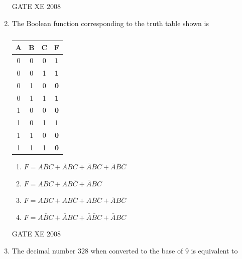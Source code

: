 \documentclass[12pt]{article}
\begin{document}
\begin{enumerate}
\begin{enumerate}
\end{enumerate}

GATE XE 2008
\item  The Boolean function corresponding to the truth table shown is

\begin{table}[H]     \centering     \caption{}     \label{}     \begin{tabular}{c|c|c|c}
    A & B & C & \textbf{F}  \\
    \hline
    0 & 0 & 0 & \textbf{1}   \\
    \hline
    0 & 0 & 1 & \textbf{1}  \\
    \hline
    0 & 1 & 0 & \textbf{0} \\
    \hline
    0 & 1 & 1 & \textbf{1} \\
    \hline
    1 & 0 & 0 & \textbf{0} \\
    \hline
    1 & 0 & 1 & \textbf{1} \\
    \hline
    1 & 1 & 0 & \textbf{0} \\
    \hline
    1 & 1 & 1 & \textbf{0} \\
    \hline
\end{tabular} \end{table}

\begin{enumerate}
\item  $F=A\bar{B}C + \bar{A}BC +\bar{A}\bar{B}C + \bar{A}\bar{B}\bar{C}$
\item  $F=ABC + AB\bar{C} + \bar{A}BC$
\item  $F=ABC + AB\bar{C} +A\bar{B}\bar{C} +\bar{A}B\bar{C}$
\item  $F=A\bar{B}C + \bar{A}BC + \bar{A}\bar{B}C + \bar{A}BC$
\end{enumerate}

GATE XE 2008
\item  The decimal number $328$ when converted to the base of $9$ is equivalent to

\begin{enumerate}
\end{enumerate}


\end{enumerate}
\end{document}
